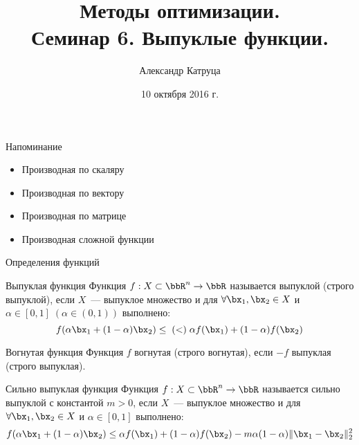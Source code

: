 \documentclass[12pt,russian]{beamer}
\title[Семинар 6]{Методы оптимизации. \\
 Семинар 6. Выпуклые функции.}
\author{Александр Катруца}
\institute{Московский физико-технический институт,\\
Факультет Управления и Прикладной Математики}
\date{10 октября 2016 г.}
\begin{document}
\begin{frame}
\maketitle
\end{frame}

\begin{frame}{Напоминание}
\begin{itemize}
\item Производная по скаляру
\item Производная по вектору
\item Производная по матрице
\item Производная сложной функции
\end{itemize}
\end{frame}

\begin{frame}{Определения функций}
\small
\begin{block}{Выпуклая функция}
Функция $f: X \subset \bbR^n \rightarrow \bbR$ называется выпуклой (строго выпуклой), если $X$~--- выпуклое множество и для $\forall \bx_1, \bx_2 \in X$ и $\alpha \in [0, 1] \; (\alpha \in (0, 1))$  выполнено:
\vspace{-4mm}
\[
f(\alpha \bx_1 + (1 - \alpha)\bx_2) \leq \; (<) \; \alpha f(\bx_1) + (1 - \alpha)f(\bx_2)
\]
\end{block}

\begin{block}{Вогнутая функция}
Функция $f$ вогнутая (строго вогнутая), если $-f$ выпуклая (строго выпуклая).
\end{block}

\begin{block}{Сильно выпуклая функция}
Функция $f: X \subset \bbR^n \rightarrow \bbR$ называется сильно  выпуклой с константой $m > 0$, если $X$~--- выпуклое множество и для $\forall \bx_1, \bx_2 \in X$ и $\alpha \in [0, 1]$  выполнено:
\vspace{-4mm}
\[
f(\alpha \bx_1 + (1 - \alpha)\bx_2) \leq \alpha f(\bx_1) + (1 - \alpha)f(\bx_2) - m \alpha (1 - \alpha) \| \bx_1 - \bx_2 \|_2^2
\]
\end{block}

\end{frame}
\end{document}
